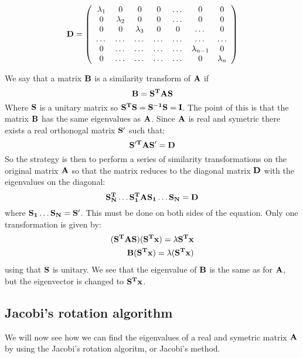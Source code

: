 \documentclass[11pt,a4wide]{article}
\begin{document}
\begin{equation}
    \bf D = \left( \begin{array}{ccccccc} \lambda_1 & 0 & 0   & 0    & \dots  &0     & 0 \\
                                0  & \lambda_2 & 0 & 0    & \dots  &0     &0 \\
                                0   & 0 & \lambda_3 & 0  &0       &\dots & 0\\
                                \dots  & \dots & \dots & \dots  &\dots      &\dots & \dots\\
                                0   & \dots & \dots & \dots  &\dots       &\lambda_{n-1} & 0\\
                                0   & \dots & \dots & \dots  &\dots       &0 & \lambda_n

             \end{array} \right) 
      \label{eq:sematrix}
\end{equation} 

We say that a matrix $\bf B$ is a similarity transform of $\bf A$ if 
\[
\bf B = \bf {S^T AS}
\]
Where $\bf S$ is a unitary matrix so $\bf{S^TS} = \bf{S^{-1}S} = \bf I$. The point of this is that the matrix $\bf B$ has the same eigenvalues as $\bf A$. Since $\bf A$ is real and symetric there exists a real orthonogal matrix $\bf S'$ such that: %
\[
\bf {S'^T AS'} = \bf D
\]
So the strategy is then to perform a series of similarity transformations on the original matrix $\bf A$ so that the matrix reduces to the diagonal matrix $\bf D$ with the eigenvalues on the diagonal:
\[
\bf{S_N^T\dots S_1^TAS_1\dots S_N} = \bf D
\]
where $\bf{S_1\dots S_N} = \bf S'$. This must be done on both sides of the equation. Only one transformation is given by:
\begin{align*}
(\bf{S^TAS})(\bf{S^Tx}) = \lambda \bf{S^Tx} \\
\bf{B(S^Tx)} = \lambda\bf{(S^Tx)}
\end{align*}
using that $\bf S$ is unitary. We see that the eigenvalue of $\bf B$ is the same as for $\bf A$, but the eigenvector is changed to $\bf{S^Tx}$.

\subsection{Jacobi's rotation algorithm} \label{sec:jacobi}
We will now see how we can find the eigenvalues of a real and symetric matrix $\bf A$ by using the Jacobi's rotation algoritm, or Jacobi's method.
\end{document}
